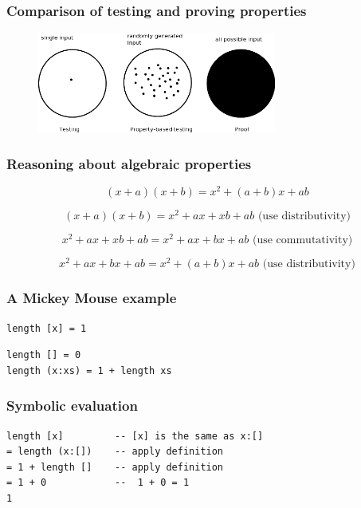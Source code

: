 \documentclass{beamer}
\begin{document}
\begin{frame}
  \frametitle{Comparison of testing and proving properties}
\begin{figure}
  \centering
     \includegraphics[width=0.7\textwidth]{testing}
\end{figure}
\end{frame}

\begin{frame}
  \frametitle{Reasoning about algebraic properties}
\begin{equation}
  \label{eq:sum}
  (x+a)(x+b) = x^2 + (a+b)x+ab
\end{equation}

\begin{equation}
  \label{eq:firstalgebra}
  (x+a)(x+b) = x^2 + ax + xb + ab \text{     (use distributivity)}
\end{equation}

\begin{equation}
x^2 + ax + xb + ab = x^2 + ax + bx + ab \text{     (use commutativity)}
\end{equation}

\begin{equation}
x^2 + ax + bx + ab = x^2 + (a + b)x + ab \text{     (use distributivity)}
\end{equation}
\end{frame}

\begin{frame}[fragile]
\frametitle{A Mickey Mouse example }
\begin{verbatim}
length [x] = 1
\end{verbatim}
\begin{lstlisting}[caption={Function definition of {\ttfamily length}},label={lst:lengthdefinition}]
length [] = 0
length (x:xs) = 1 + length xs  
\end{lstlisting}
\end{frame}

\begin{frame}[fragile]
\frametitle{Symbolic evaluation}

\begin{lstlisting}[label={lst:lengthproof}]
length [x]         -- [x] is the same as x:[]
= length (x:[])    -- apply definition
= 1 + length []    -- apply definition
= 1 + 0            --  1 + 0 = 1
1
\end{lstlisting}
\end{frame}
\end{document}
